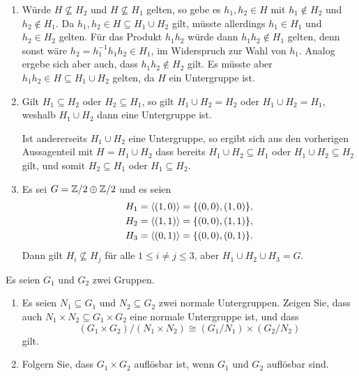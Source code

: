 \begin{solution}
  \begin{enumerate}
    \item
      Würde $H \nsubseteq H_2$ und $H \nsubseteq H_1$ gelten, so gebe es $h_1, h_2 \in H$ mit $h_1 \notin H_2$ und $h_2 \notin H_1$.
      Da $h_1, h_2 \in H \subseteq H_1 \cup H_2$ gilt, müsste allerdings $h_1 \in H_1$ und $h_2 \in H_2$ gelten.
      Für das Produkt $h_1 h_2$ würde dann $h_1 h_2 \notin H_1$ gelten, denn sonst wäre $h_2 = h_1^{-1} h_1 h_2 \in H_1$, im Widerspruch zur Wahl von $h_1$.
      Analog ergebe sich aber auch, dass $h_1 h_2 \notin H_2$ gilt.
      Es müsste aber $h_1 h_2 \in H \subseteq H_1 \cup H_2$ gelten, da $H$ ein Untergruppe ist.
      
    \item
      Gilt $H_1 \subseteq H_2$ oder $H_2 \subseteq H_1$, so gilt $H_1 \cup H_2 = H_2$ oder $H_1 \cup H_2 = H_1$, weshalb $H_1 \cup H_2$ dann eine Untergruppe ist.
      
      Ist andererseits $H_1 \cup H_2$ eine Untergruppe, so ergibt sich aus den vorherigen Aussagenteil mit $H = H_1 \cup H_2$ dass bereits $H_1 \cup H_2 \subseteq H_1$ oder $H_1 \cup H_2 \subseteq H_2$ gilt, und somit $H_2 \subseteq H_1$ oder $H_1 \subseteq H_2$.
      
    \item
      Es sei $G = \mathbb{Z}/2 \oplus \mathbb{Z}/2$ und es seien
      \begin{align*}
        H_1 &= \langle (1,0) \rangle = \{ (0,0), (1,0) \},
        \\
        H_2 &= \langle (1,1) \rangle = \{ (0,0), (1,1) \},
        \\
        H_3 &= \langle (0,1) \rangle = \{ (0,0), (0,1) \}.
      \end{align*}
      Dann gilt $H_i \nsubseteq H_j$ für alle $1 \leq i \neq j \leq 3$, aber $H_1 \cup H_2 \cup H_3 = G$.
  \end{enumerate}
\end{solution}


\begin{question}[subtitle = Produkte von Normalteilern und auflösbaren Gruppen]
  Es seien $G_1$ und $G_2$ zwei Gruppen.
  \begin{enumerate}
    \item
      Es seien $N_1 \subseteq G_1$ und $N_2 \subseteq G_2$ zwei normale Untergruppen.
      Zeigen Sie, dass auch $N_1 \times N_2 \subseteq G_1 \times G_2$ eine normale Untergruppe ist, und dass
      \[
        (G_1 \times G_2)/(N_1 \times N_2) \cong (G_1/N_1) \times (G_2/N_2)
      \]
      gilt.
    \item
      Folgern Sie, dass $G_1 \times G_2$ auflösbar ist, wenn $G_1$ und $G_2$ auflösbar sind.
  \end{enumerate}
\end{question}


